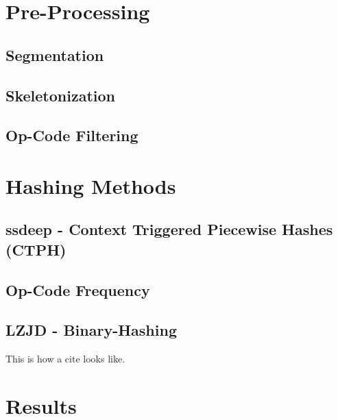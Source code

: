 \documentclass{article}
\begin{document}
\section{Pre-Processing}
\subsection{Segmentation}
\subsection{Skeletonization}
\subsection{Op-Code Filtering}

\section{Hashing Methods}
\subsection{ssdeep - Context Triggered Piecewise Hashes (CTPH)}
\subsection{Op-Code Frequency}
\subsection{LZJD - Binary-Hashing}
This is how a cite\cite{sung2004static} looks like.
\section{Results}

\printbibliography
\end{document}
